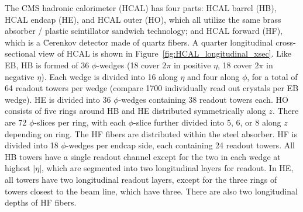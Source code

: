 \documentclass[dissertation.tex]{subfiles}
\begin{document}
The CMS hadronic calorimeter (HCAL) has four parts: HCAL barrel (HB), HCAL endcap (HE), and HCAL outer (HO), which all utilize the same brass absorber / plastic scintillator sandwich technology; and HCAL forward (HF), which is a \u{C}erenkov detector made of quartz fibers.  A quarter longitudinal cross-sectional view of HCAL is shown in Figure~\ref{fig:HCAL_longitudinal_xsec}.  Like EB, HB is formed of 36 $\phi$-wedges (18 cover $2\pi$ in positive $\eta$, 18 cover $2\pi$ in negative $\eta$).  Each wedge is divided into 16 along $\eta$ and four along $\phi$, for a total of 64 readout towers per wedge (compare 1700 individually read out crystals per EB wedge).  HE is divided into 36 $\phi$-wedges containing 38 readout towers each.  HO consists of five rings around HB and HE distributed symmetrically along $z$.  There are 72 $\phi$-slices per ring, with each $\phi$-slice further divided into 5, 6, or 8 along $z$ depending on ring.  The HF fibers are distributed within the steel absorber.  HF is divided into 18 $\phi$-wedges per endcap side, each containing 24 readout towers.  All HB towers have a single readout channel except for the two in each wedge at highest $|\eta|$, which are segmented into two longitudinal layers for readout.  In HE, all towers have two longitudinal readout layers, except for the three rings of towers closest to the beam line, which have three.  There are also two longitudinal depths of HF fibers.
\end{document}
